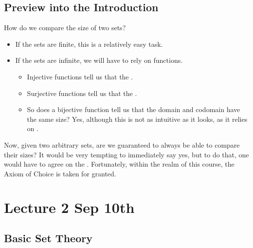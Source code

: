 \documentclass[notoc,notitlepage]{tufte-book}
\begin{document}

\section{Preview into the Introduction}%
\label{sec:preview_into_the_introduction}

How do we compare the size of two sets?

\begin{itemize}
  \item If the sets are finite, this is a relatively easy task.
  \item If the sets are infinite, we will have to rely on functions.
    \begin{itemize}
      \item Injective functions tell us that the .
      \item Surjective functions tell us that the .
      \item So does a bijective function tell us that the domain and codomain have the same size? Yes, although this is not as intuitive as it looks, as it relies on .
    \end{itemize}
\end{itemize}

Now, given two arbitrary sets, are we guaranteed to always be able to compare their sizes? It would be very tempting to immediately say yes, but to do that, one would have to agree on the . Fortunately, within the realm of this course, the Axiom of Choice is taken for granted.



\chapter{Lecture 2 Sep 10th}%
\label{chp:lecture_2_sep_10th}

\section{Basic Set Theory}%
\label{sec:basic_set_theory}
\end{document}
